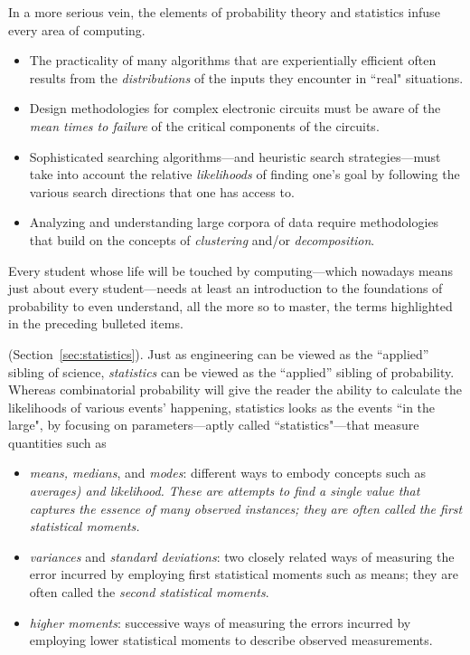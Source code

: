 In a more serious vein, the elements of probability theory and statistics infuse every area of
computing.
\begin{itemize}
\item
The practicality of many algorithms that are experientially efficient often results from the 
{\em distributions} of the inputs they encounter in ``real" situations.
\item
Design methodologies for complex electronic circuits must be aware of the 
{\em mean times to failure} of the critical components of the circuits.
\item
Sophisticated searching algorithms---and heuristic search strategies---must take into account the relative
{\em likelihoods} of finding one's goal by following the various search directions that one has access to.
\item
Analyzing and understanding large corpora of data require methodologies that build on the 
concepts of {\em clustering} and/or {\em decomposition}.
\end{itemize}
Every student whose life will be touched by computing---which nowadays means just about
every student---needs at least an introduction to the foundations of
probability to even understand, all the more so to master, the terms highlighted in the preceding bulleted items.

\medskip


 (Section~\ref{sec:statistics}).
Just as engineering can be viewed as the ``applied'' sibling of science, {\it statistics} can be viewed as 
the ``applied'' sibling of probability.  Whereas combinatorial probability will give the reader the ability to
calculate the likelihoods of various events' happening, statistics looks as the events ``in the large", by focusing 
on parameters---aptly called ``statistics"---that measure quantities such as
\begin{itemize}
\item
{\em means, medians}, and {\em modes}: different ways to embody concepts 
such as {\em averages) and {\em likelihood}.  These are attempts to find a single value that captures the essence
of many observed instances; they are often called the {\it first statistical moments}.
}
\item
{\em variances} and {\em standard deviations}: two closely related ways of measuring the error incurred by
employing first statistical moments such as means; they are often called the {\it second statistical moments}.
\item
{\em higher moments}: successive ways of measuring the errors incurred by
employing lower statistical moments to describe observed measurements.
\end{itemize}


